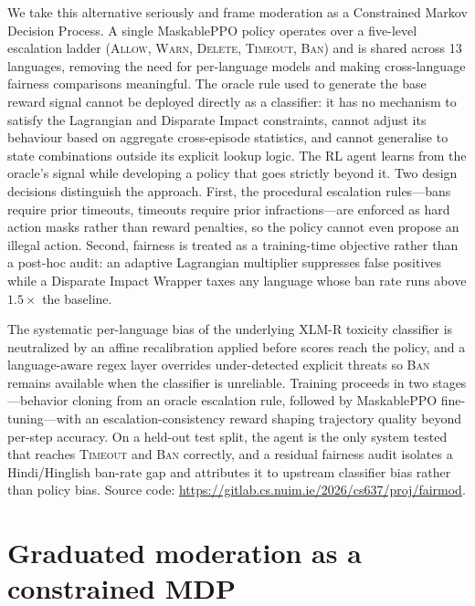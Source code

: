 \documentclass{article}
\begin{document}
We take this alternative seriously and frame moderation as a Constrained Markov
Decision Process. A single MaskablePPO policy operates over a five-level
escalation ladder (\textsc{Allow}, \textsc{Warn}, \textsc{Delete},
\textsc{Timeout}, \textsc{Ban}) and is shared across 13 languages, removing the
need for per-language models and making cross-language fairness comparisons
meaningful. The oracle rule used to generate the base reward signal cannot be
deployed directly as a classifier: it has no mechanism to satisfy the Lagrangian
and Disparate Impact constraints, cannot adjust its behaviour based on aggregate
cross-episode statistics, and cannot generalise to state combinations outside its
explicit lookup logic. The RL agent learns from the oracle's signal while
developing a policy that goes strictly beyond it.
Two design decisions distinguish the approach. First, the procedural
escalation rules---bans require prior timeouts, timeouts require prior
infractions---are enforced as hard action masks rather than reward penalties,
so the policy cannot even propose an illegal action. Second, fairness is treated
as a training-time objective rather than a post-hoc audit: an adaptive
Lagrangian multiplier suppresses false positives while a Disparate Impact
Wrapper taxes any language whose ban rate runs above $1.5\times$ the baseline.

The systematic per-language bias of the underlying XLM-R toxicity classifier is
neutralized by an affine recalibration applied before scores reach the policy,
and a language-aware regex layer overrides under-detected explicit threats so
\textsc{Ban} remains available when the classifier is unreliable. Training
proceeds in two stages---behavior cloning from an oracle escalation rule,
followed by MaskablePPO fine-tuning---with an escalation-consistency reward
shaping trajectory quality beyond per-step accuracy. On a held-out test split,
the agent is the only system tested that reaches \textsc{Timeout} and
\textsc{Ban} correctly, and a residual fairness audit isolates a
Hindi/Hinglish ban-rate gap and attributes it to upstream classifier bias
rather than policy bias. Source code:
\url{https://gitlab.cs.nuim.ie/2026/cs637/proj/fairmod}.


\section{Graduated moderation as a constrained MDP}
\label{sec:formulation}
\end{document}
